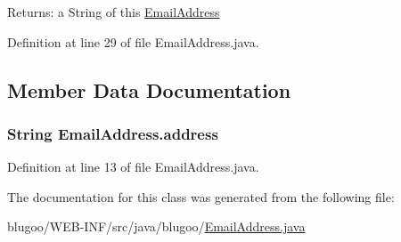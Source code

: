 \begin{Desc}
\item[Returns:]a String of this \hyperlink{classEmailAddress}{EmailAddress} \end{Desc}


Definition at line 29 of file EmailAddress.java.

\subsection{Member Data Documentation}
\hypertarget{classEmailAddress_7522c4b13c3bb74397f9b5722dc09fe8}{
\subsubsection{\setlength{\rightskip}{0pt plus 5cm}String {\bf EmailAddress.address}}}
\label{classEmailAddress_7522c4b13c3bb74397f9b5722dc09fe8}




Definition at line 13 of file EmailAddress.java.

The documentation for this class was generated from the following file:\begin{CompactItemize}
\item 
blugoo/WEB-INF/src/java/blugoo/\hyperlink{EmailAddress_8java}{EmailAddress.java}\end{CompactItemize}
